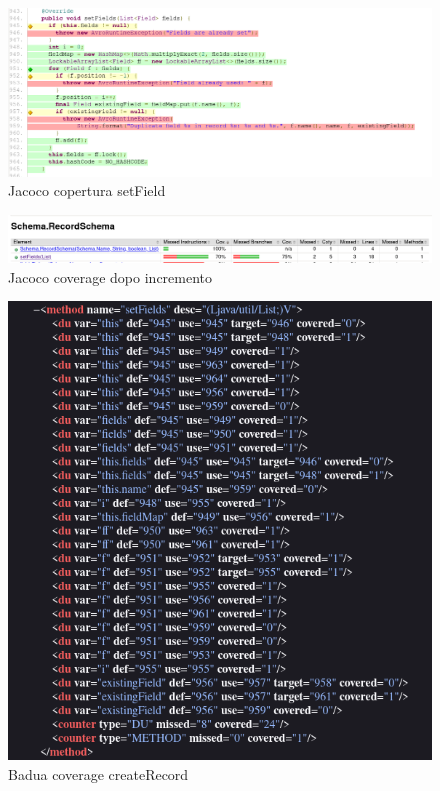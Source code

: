 \documentclass[12pt, a4paper]{article}
\begin{document}
  \begin{figure}
    \includegraphics[width=\linewidth]{./images/create_record/JacocoCoverage4.png}
    \caption{Jacoco copertura setField}
    \label{fig:JacocoCoverageCreateRecord4}
  \end{figure}

  \begin{figure}
    \includegraphics[width=\linewidth]{./images/create_record/JacocoCoverage5.png}
    \caption{Jacoco coverage dopo incremento}
    \label{fig:JacocoCoverageCreateRecord5}
  \end{figure}

  \begin{figure}
    \includegraphics[width=\linewidth]{./images/create_record/BaduaCoverage1.png}
    \caption{Badua coverage createRecord}
    \label{fig:BaduaCoverageCreateRecord1}
  \end{figure}
\end{document}
